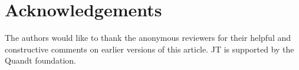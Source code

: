 \documentclass[11pt, a4paper]{article}
\begin{document}
\section*{Acknowledgements}
The authors would like to thank the anonymous reviewers for their helpful and constructive comments on earlier versions of this article. JT is supported by the Quandt foundation.



  

% 


\printbibliography
  
  
\end{document}

